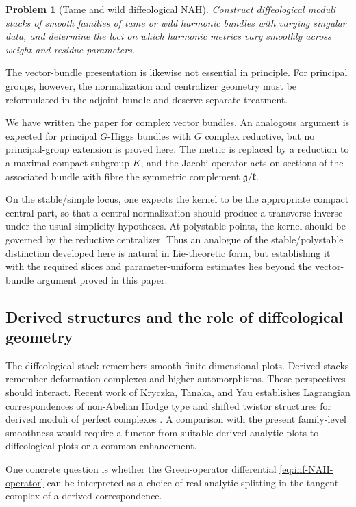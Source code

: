\documentclass[11pt,reqno]{amsart}
\newtheorem{problem}[theorem]{Problem}
\theoremstyle{definition}
\theoremstyle{remark}
\begin{document}
\begin{problem}[Tame and wild diffeological NAH]\label{prob:singular}
Construct diffeological moduli stacks of smooth families of tame or wild harmonic bundles with varying singular data, and determine the loci on which harmonic metrics vary smoothly across weight and residue parameters.
\end{problem}


The vector-bundle presentation is likewise not essential in principle.  For principal groups, however, the normalization and centralizer geometry must be reformulated in the adjoint bundle and deserve separate treatment.


We have written the paper for complex vector bundles.  An analogous argument is expected for principal $G$-Higgs bundles with $G$ complex reductive, but no principal-group extension is proved here.  The metric is replaced by a reduction to a maximal compact subgroup $K$, and the Jacobi operator acts on sections of the associated bundle with fibre the symmetric complement $\mathfrak g/\mathfrak k$.

On the stable/simple locus, one expects the kernel to be the appropriate compact central part, so that a central normalization should produce a transverse inverse under the usual simplicity hypotheses.  At polystable points, the kernel should be governed by the reductive centralizer.  Thus an analogue of the stable/polystable distinction developed here is natural in Lie-theoretic form, but establishing it with the required slices and parameter-uniform estimates lies beyond the vector-bundle argument proved in this paper.

\subsection{Derived structures and the role of diffeological geometry}

The diffeological stack remembers smooth finite-dimensional plots.  Derived stacks remember deformation complexes and higher automorphisms.  These perspectives should interact.  Recent work of Kryczka, Tanaka, and Yau establishes Lagrangian correspondences of non-Abelian Hodge type and shifted twistor structures for derived moduli of perfect complexes \cite{KryczkaTanakaYau2026}.  A comparison with the present family-level smoothness would require a functor from suitable derived analytic plots to diffeological plots or a common enhancement.

One concrete question is whether the Green-operator differential \eqref{eq:inf-NAH-operator} can be interpreted as a choice of real-analytic splitting in the tangent complex of a derived correspondence.
\end{document}
